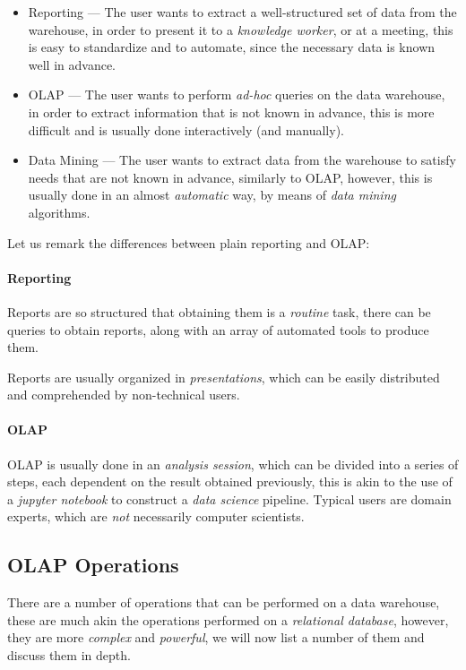 \documentclass[openright, twoside, twocolumn, a4paper, 10pt]{report}
\begin{document}
\begin{itemize}
	\item Reporting --- The user wants to extract a well-structured set of data from the
	      warehouse, in order to present it to a \emph{knowledge worker}, or at a meeting,
	      this is easy to standardize and to automate, since the necessary data is known
	      well in advance.
	\item OLAP --- The user wants to perform \emph{ad-hoc} queries on the data warehouse,
	      in order to extract information that is not known in advance, this is more difficult
	      and is usually done interactively (and manually).
	\item Data Mining --- The user wants to extract data from the warehouse to satisfy needs
	      that are not known in advance, similarly to OLAP, however, this is usually done in
	      an almost \emph{automatic} way, by means of \emph{data mining} algorithms.
\end{itemize}

Let us remark the differences between plain reporting and OLAP:\@

\paragraph{Reporting}
Reports are so structured that obtaining them is a \emph{routine} task, there can
be queries to obtain reports, along with an array of automated tools to produce them.

Reports are usually organized in \emph{presentations}, which can be easily distributed
and comprehended by non-technical users.

\paragraph{OLAP}
OLAP is usually done in an \emph{analysis session}, which can be divided into a
series of steps, each dependent on the result obtained previously, this is akin
to the use of a \emph{jupyter notebook} to construct a \emph{data science} pipeline.
Typical users are domain experts, which are \emph{not} necessarily computer scientists.

\subsection{OLAP Operations}

There are a number of operations that can be performed on a data warehouse, these
are much akin the operations performed on a \emph{relational database}, however,
they are more \emph{complex} and \emph{powerful}, we will now list a number of them
and discuss them in depth.
\end{document}
